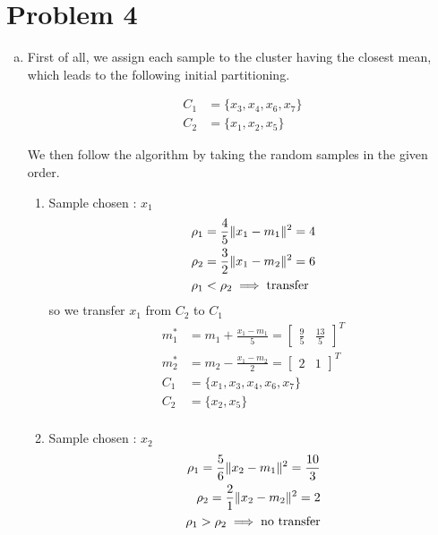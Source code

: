 \documentclass[a4paper, 10pt, twoside]{article}
\begin{document}
\section*{Problem 4}
\begin{enumerate}[a)]
	\item First of all, we assign each sample to the cluster having the closest mean, which leads to the following initial partitioning.

	      \begin{align*}
		      C_1 & = \{ x_3, x_4, x_6, x_7\} \\
		      C_2 & = \{ x_1, x_2, x_5 \}
	      \end{align*}

	      We then follow the algorithm by taking the random samples in the given order.

	      \begin{enumerate}[1.]
		      \item Sample chosen : $x_1$
		            \begin{align*}
			            \rho_1 & = \frac{4}{5}\Vert x_1-m_1 \Vert^2 = 4 \\
			            \rho_2 & = \frac{3}{2}\Vert x_1-m_2 \Vert^2 = 6 \\
			            \rho_1 & < \rho_2 \implies \text{transfer} \\
		            \end{align*}
		            so we transfer $x_1$ from $C_2$ to $C_1$
		            \begin{align*}
			            m_1^* & = m_1 + \frac{x_1-m_1}{5} = \begin{bmatrix} \frac{9}{5} & \frac{13}{5}\end{bmatrix}^T \\
			            m_2^* & = m_2 - \frac{x_1-m_2}{2} = \begin{bmatrix} 2 & 1\end{bmatrix}^T \\
			            C_1   & = \{ x_1, x_3, x_4, x_6, x_7\}                           \\
			            C_2   & = \{ x_2, x_5 \}                                         \\
		            \end{align*}

		      \item Sample chosen : $x_2$
		            \begin{align*}
			            \rho_1 = \frac{5}{6}\Vert x_2-m_1 \Vert^2 = \frac{10}{3} \\
			            \rho_2 = \frac{2}{1}\Vert x_2-m_2 \Vert^2 = 2            \\
			            \rho_1 > \rho_2 \implies \text{no transfer}         \\
		            \end{align*}


\end{enumerate}
\end{enumerate}
\end{document}
